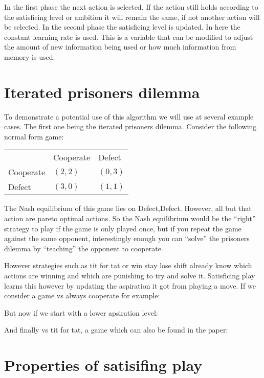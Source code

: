 In the first phase the next action is selected. If the action still holds
according to the satisficing level or ambition it will remain the same, if not another
action will be selected. In the second phase the satisficing level is updated.
In here the constant learning rate is used. This is a variable that can be
modified to adjust the amount of new information being used or how much
information from memory is used.


\section{Iterated prisoners dilemma}
\drafting
To demonstrate a potential use of this algorithm we will use at several example
cases. The first one being the iterated prisoners dilemma. Consider
the following normal form game:

\begin{tabular}{lll}
            & Cooperate   & Defect \\
  Cooperate & $(2,2)$     & $(0,3)$  \\
  Defect    & $(3,0)$     & $(1,1)$  \\
\end{tabular}

The Nash equilibrium of this game lies on Defect,Defect. However, all but
that action are pareto optimal actions. So the Nash equilibrium would be the
``right'' strategy to play if the game is only played once, but if you repeat
the game against the same opponent, interestingly enough you can ``solve''
the prisoners dilemma by ``teaching'' the opponent to cooperate.

However strategies such as tit for tat or win stay lose shift already know
which actions are winning and which are punishing to try and solve it.
Satisficing play learns this however by updating the aspiration it got from
playing a move. If we consider a game vs always cooperate for example:


But now if we start with a lower apsiration level:


And finally vs tit for tat, a game which can also be found in the
\citep{stimpson:2001} paper:

\section{Properties of satisifing play}
\drafting

